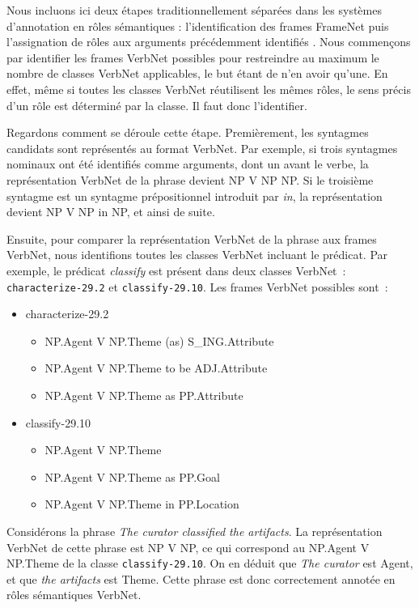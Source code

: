 Nous incluons ici deux étapes traditionnellement séparées dans les systèmes
d'annotation en rôles sémantiques : l'identification des frames FrameNet puis
l'assignation de rôles aux arguments précédemment identifiés
\citep{gildea2002automatic,das2014frame}. Nous commençons par identifier les
frames VerbNet possibles pour restreindre au maximum le nombre de classes
VerbNet applicables, le but étant de n'en avoir qu'une. En effet, même si
toutes les classes VerbNet réutilisent les mêmes rôles, le sens précis d'un
rôle est déterminé par la classe. Il faut donc l'identifier.

Regardons comment se déroule cette étape. Premièrement, les syntagmes candidats
sont représentés au format VerbNet. Par exemple, si trois syntagmes nominaux
ont été identifiés comme arguments, dont un avant le verbe, la représentation
VerbNet de la phrase devient NP V NP NP. Si le troisième syntagme est un
syntagme prépositionnel introduit par \textit{in}, la représentation devient NP
V NP in NP, et ainsi de suite.

Ensuite, pour comparer la représentation VerbNet de la phrase aux frames
VerbNet, nous identifions toutes les classes VerbNet incluant le prédicat. Par
exemple, le prédicat \textit{classify} est présent dans deux classes VerbNet~:
\texttt{characterize-29.2} et \texttt{classify-29.10}. Les frames VerbNet
possibles sont~:

\begin{itemize}
    \item characterize-29.2
    \begin{itemize}
        \item NP.Agent V NP.Theme (as) S\_ING.Attribute
        \item NP.Agent V NP.Theme to be ADJ.Attribute
        \item NP.Agent V NP.Theme as PP.Attribute
    \end{itemize}
    \item classify-29.10
    \begin{itemize}
        \item NP.Agent V NP.Theme
        \item NP.Agent V NP.Theme as PP.Goal
        \item NP.Agent V NP.Theme in PP.Location
    \end{itemize}
\end{itemize}

Considérons la phrase \textit{The curator classified the artifacts}. La
représentation VerbNet de cette phrase est NP V NP, ce qui correspond au
NP.Agent V NP.Theme de la classe \texttt{classify-29.10}. On en déduit que
\textit{The curator} est Agent, et que \textit{the artifacts} est Theme. Cette
phrase est donc correctement annotée en rôles sémantiques VerbNet.

